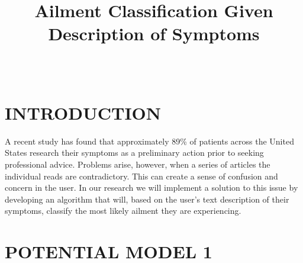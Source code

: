\documentclass[10pt, final, comsoc, conference]{IEEEtran}
\begin{document}
\title{Ailment Classification Given Description of Symptoms}
\author{
	\\
}

\maketitle
\section{\MakeTextUppercase{Introduction}}
A recent study has found that approximately 89\% of patients across the United States
research their symptoms as a preliminary action prior to seeking professional advice.
Problems arise, however, when a series of articles the individual reads are contradictory.
This can create a sense of confusion and concern in the user.
In our research we will implement a solution to this issue by developing an algorithm that will,
based on the user's text description of their symptoms, classify the most likely ailment
they are experiencing.

\section{\MakeTextUppercase{Potential Model 1}}
\end{document}
